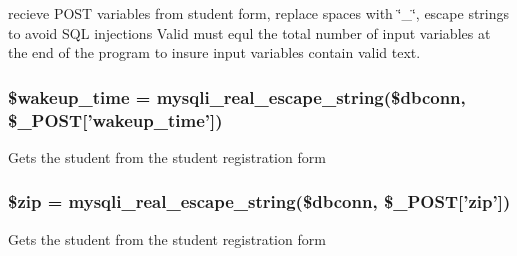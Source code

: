 recieve \-P\-O\-S\-T variables from student form, replace spaces with \char`\"{}\-\_\-\char`\"{}, escape strings to avoid \-S\-Q\-L injections \-Valid must equl the total number of input variables at the end of the program to insure input variables contain valid text. \hypertarget{admin__view_2validate_2studentVal_8php_ade31df5f8971826d6902226d01975007}{
\subsubsection[{\$wakeup\-\_\-time}]{\setlength{\rightskip}{0pt plus 5cm}\$wakeup\-\_\-time = mysqli\-\_\-real\-\_\-escape\-\_\-string(\$dbconn, \$\-\_\-\-P\-O\-S\-T\mbox{[}'wakeup\-\_\-time'\mbox{]})}}\label{admin__view_2validate_2studentVal_8php_ade31df5f8971826d6902226d01975007}
\-Gets the student from the student registration form \hypertarget{admin__view_2validate_2studentVal_8php_aa91be3142812d8cd4221c6f54555079b}{
\subsubsection[{\$zip}]{\setlength{\rightskip}{0pt plus 5cm}\$zip = mysqli\-\_\-real\-\_\-escape\-\_\-string(\$dbconn, \$\-\_\-\-P\-O\-S\-T\mbox{[}'zip'\mbox{]})}}\label{admin__view_2validate_2studentVal_8php_aa91be3142812d8cd4221c6f54555079b}
\-Gets the student from the student registration form 
